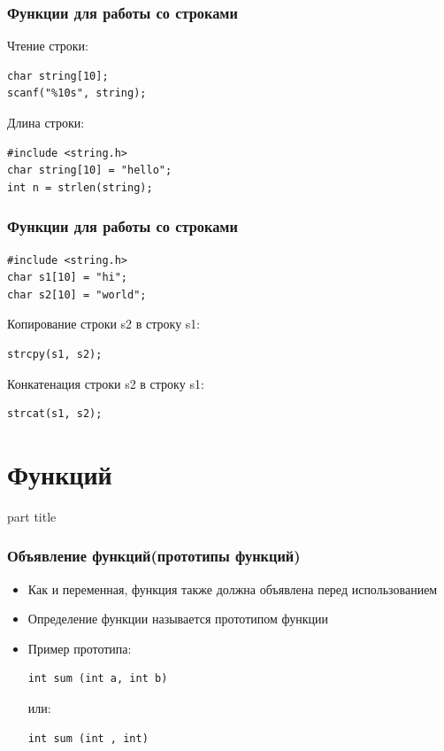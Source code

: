 \documentclass[14pt,pdf,hyperref={unicode}]{beamer}
\begin{document}
\begin{frame}[fragile]
\frametitle{Функции для работы со строками} 
Чтение строки:
\begin{lstlisting}
char string[10];
scanf("%10s", string);
\end{lstlisting}
Длина строки:
\begin{lstlisting}
#include <string.h>
char string[10] = "hello";
int n = strlen(string);
\end{lstlisting}
\end{frame}

\begin{frame}[fragile]
\frametitle{Функции для работы со строками} 
\begin{lstlisting}
#include <string.h>
char s1[10] = "hi";
char s2[10] = "world";
\end{lstlisting}
Копирование строки s2 в строку s1:
\begin{lstlisting}
strcpy(s1, s2);
\end{lstlisting}
Конкатенация строки s2 в строку s1:
\begin{lstlisting}
strcat(s1, s2);
\end{lstlisting}
\end{frame}









\section{Функций}
\begin{frame}
\begin{center}
\begin{beamercolorbox}[sep=8pt,center]{part
title}
\insertsection
\end{beamercolorbox}
\end{center}
\end{frame}


\begin{frame}[fragile]
\frametitle{Объявление функций(прототипы функций)} 
\begin{itemize}
\item Как и переменная, функция также должна объявлена перед использованием
\item Определение функции называется прототипом функции
\item Пример прототипа:\\
\begin{lstlisting}
int sum (int a, int b)
\end{lstlisting}
или:
\begin{lstlisting}
int sum (int , int)
\end{lstlisting}
\end{itemize}
\end{frame}
\end{document}
